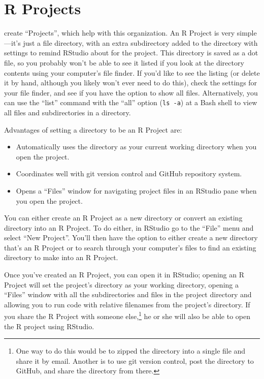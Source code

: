 \documentclass[]{tufte-book}
\providecommand{\tightlist}{%
  \setlength{\itemsep}{0pt}\setlength{\parskip}{0pt}}
\begin{document}
\hypertarget{r-projects}{%
\section{R Projects}\label{r-projects}}

 create ``Projects'', which help with this
organization. An R Project is very simple---it's just a file directory, with an
extra subdirectory added to the directory with settings to remind RStudio about for the project. This directory is
saved as a dot file, so you probably won't be able to see it
listed if you look at the directory contents using your computer's file finder. If you'd like
to see the listing (or delete it by hand, although you likely won't ever need to
do this), check the settings for your file finder, and see if you have the option
to show all files. Alternatively, you can use the ``list'' command with the ``all'' option
(\texttt{ls\ -a}) at a Bash shell to view all files and subdirectories in a directory.

Advantages of setting a directory to be an R Project are:

\begin{itemize}
\tightlist
\item
  Automatically uses the directory as your current working directory when you open the project.
\item
  Coordinates well with git version control and GitHub repository system.
\item
  Opens a ``Files'' window for navigating project files in an RStudio pane when you open the project.
\end{itemize}

You can either create an R Project as a new directory or convert an existing directory into
an R Project. To do either, in RStudio go to the ``File'' menu and select ``New Project''. You'll
then have the option to either create a new directory that's an R Project or to search through
your computer's files to find an existing directory to make into an R Project.

Once you've created an R Project, you can open it in RStudio; opening an R Project will set
the project's directory as your working directory, opening a ``Files'' window with all the
subdirectories and files in the project directory and allowing you to run code with
relative filenames from the project's directory. If you
share the R Project with someone else,\footnote{One way to do this would be to zipped the directory
  into a single file and share it by email. Another is to use git version control, post the
  directory to GitHub, and share the directory from there.} he or she will also be able to
open the R project using RStudio.
\end{document}
